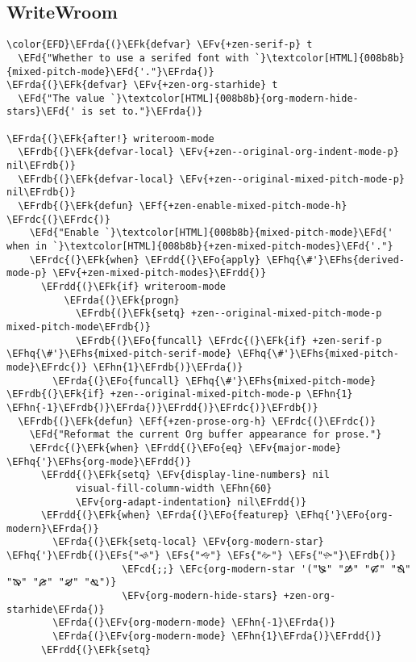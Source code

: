 \documentclass{article}
\newcommand{\EFc}[1]{\textcolor{EFc}{#1}} %
\newcommand{\EFcd}[1]{\textcolor{EFcd}{#1}} %
\newcommand{\EFs}[1]{\textcolor{EFs}{#1}} %
\newcommand{\EFd}[1]{\textcolor{EFd}{#1}} %
\newcommand{\EFk}[1]{\textcolor{EFk}{#1}} %
\newcommand{\EFf}[1]{\textcolor{EFf}{#1}} %
\newcommand{\EFv}[1]{\textcolor{EFv}{#1}} %
\newcommand{\EFo}[1]{\textcolor{EFo}{#1}} %
\newcommand{\EFhn}[1]{\textcolor{EFhn}{\textbf{#1}}} %
\newcommand{\EFhq}[1]{#1} %
\newcommand{\EFhs}[1]{\textcolor{EFhs}{#1}} %
\newcommand{\EFrda}[1]{\textcolor{EFrda}{#1}} %
\newcommand{\EFrdb}[1]{\textcolor{EFrdb}{#1}} %
\newcommand{\EFrdc}[1]{\textcolor{EFrdc}{#1}} %
\newcommand{\EFrdd}[1]{\textcolor{EFrdd}{#1}} %
\begin{document}
\subsection{WriteWroom}
\label{sec:orga4f8c72}
\begin{Code}
\begin{Verbatim}
\color{EFD}\EFrda{(}\EFk{defvar} \EFv{+zen-serif-p} t
  \EFd{"Whether to use a serifed font with `}\textcolor[HTML]{008b8b}{mixed-pitch-mode}\EFd{'."}\EFrda{)}
\EFrda{(}\EFk{defvar} \EFv{+zen-org-starhide} t
  \EFd{"The value `}\textcolor[HTML]{008b8b}{org-modern-hide-stars}\EFd{' is set to."}\EFrda{)}

\EFrda{(}\EFk{after!} writeroom-mode
  \EFrdb{(}\EFk{defvar-local} \EFv{+zen--original-org-indent-mode-p} nil\EFrdb{)}
  \EFrdb{(}\EFk{defvar-local} \EFv{+zen--original-mixed-pitch-mode-p} nil\EFrdb{)}
  \EFrdb{(}\EFk{defun} \EFf{+zen-enable-mixed-pitch-mode-h} \EFrdc{(}\EFrdc{)}
    \EFd{"Enable `}\textcolor[HTML]{008b8b}{mixed-pitch-mode}\EFd{' when in `}\textcolor[HTML]{008b8b}{+zen-mixed-pitch-modes}\EFd{'."}
    \EFrdc{(}\EFk{when} \EFrdd{(}\EFo{apply} \EFhq{\#'}\EFhs{derived-mode-p} \EFv{+zen-mixed-pitch-modes}\EFrdd{)}
      \EFrdd{(}\EFk{if} writeroom-mode
          \EFrda{(}\EFk{progn}
            \EFrdb{(}\EFk{setq} +zen--original-mixed-pitch-mode-p mixed-pitch-mode\EFrdb{)}
            \EFrdb{(}\EFo{funcall} \EFrdc{(}\EFk{if} +zen-serif-p \EFhq{\#'}\EFhs{mixed-pitch-serif-mode} \EFhq{\#'}\EFhs{mixed-pitch-mode}\EFrdc{)} \EFhn{1}\EFrdb{)}\EFrda{)}
        \EFrda{(}\EFo{funcall} \EFhq{\#'}\EFhs{mixed-pitch-mode} \EFrdb{(}\EFk{if} +zen--original-mixed-pitch-mode-p \EFhn{1} \EFhn{-1}\EFrdb{)}\EFrda{)}\EFrdd{)}\EFrdc{)}\EFrdb{)}
  \EFrdb{(}\EFk{defun} \EFf{+zen-prose-org-h} \EFrdc{(}\EFrdc{)}
    \EFd{"Reformat the current Org buffer appearance for prose."}
    \EFrdc{(}\EFk{when} \EFrdd{(}\EFo{eq} \EFv{major-mode} \EFhq{'}\EFhs{org-mode}\EFrdd{)}
      \EFrdd{(}\EFk{setq} \EFv{display-line-numbers} nil
            visual-fill-column-width \EFhn{60}
            \EFv{org-adapt-indentation} nil\EFrdd{)}
      \EFrdd{(}\EFk{when} \EFrda{(}\EFo{featurep} \EFhq{'}\EFo{org-modern}\EFrda{)}
        \EFrda{(}\EFk{setq-local} \EFv{org-modern-star} \EFhq{'}\EFrdb{(}\EFs{"🙘"} \EFs{"🙙"} \EFs{"🙚"} \EFs{"🙛"}\EFrdb{)}
                    \EFcd{;;} \EFc{org-modern-star '("🙐" "🙑" "🙒" "🙓" "🙔" "🙕" "🙖" "🙗")}
                    \EFv{org-modern-hide-stars} +zen-org-starhide\EFrda{)}
        \EFrda{(}\EFv{org-modern-mode} \EFhn{-1}\EFrda{)}
        \EFrda{(}\EFv{org-modern-mode} \EFhn{1}\EFrda{)}\EFrdd{)}
      \EFrdd{(}\EFk{setq}

\end{Verbatim}
\end{Code}
\end{document}
